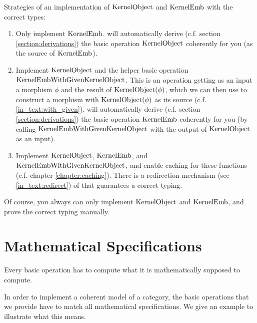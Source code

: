 \begin{example}
 Strategies of an implementation of $\mathrm{KernelObject}$ and $\mathrm{KernelEmb}$ with the correct types:
 \begin{enumerate}
  \item Only implement $\mathrm{KernelEmb}$. \CapPkg will automatically derive (c.f. section \ref{section:derivations}) the basic operation
        $\mathrm{KernelObject}$ coherently for you (as the source of $\mathrm{KernelEmb}$).
  \item Implement $\mathrm{KernelObject}$ and the helper basic operation $\mathrm{KernelEmbWithGivenKernelObject}$.
        This is an operation getting as an input a morphism $\phi$ and the result of $\mathrm{KernelObject}( \phi )$,
        which we can then use to construct a morphism with $\mathrm{KernelObject}( \phi )$ as its source (c.f. \ref{in_text:with_given}).
        \CapPkg will automatically derive (c.f. section \ref{section:derivations}) the basic operation
        $\mathrm{KernelEmb}$ coherently for you (by calling $\mathrm{KernelEmbWithGivenKernelObject}$ with the output of $\mathrm{KernelObject}$ as an input).
  \item Implement $\mathrm{KernelObject}$, $\mathrm{KernelEmb}$, and $\mathrm{KernelEmbWithGivenKernelObject}$, and enable caching for these functions (c.f. chapter \ref{chapter:caching}).
        There is a redirection mechanism (see \ref{in_text:redirect}) of \CapPkg that guarantees a correct typing.
 \end{enumerate}
 Of course, you always can only implement $\mathrm{KernelObject}$ and $\mathrm{KernelEmb}$, and prove the correct typing manually.
\end{example}



\section{Mathematical Specifications}

\begin{specification}
 Every basic operation has to compute what it is mathematically supposed to compute.
\end{specification} 

In order to implement a coherent model of a category, the basic operations that we provide have to match all mathematical
specifications. We give an example to illustrate what this means.

